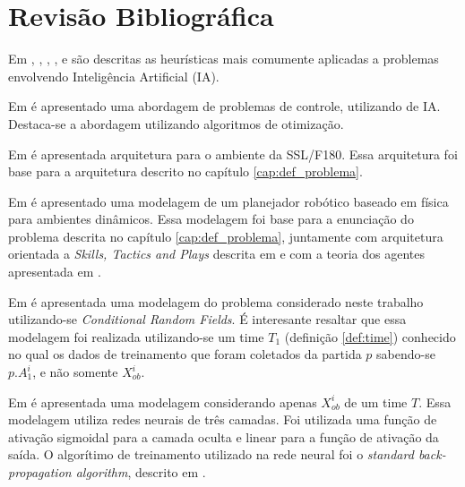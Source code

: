 \chapter{Revisão Bibliográfica}\label{cap:rev_bibliografica}


Em \cite{russellnorvig}, \cite{haykin2001redes}, \cite{kosko1997fuzzy}, \cite{passos2005datamining},
\cite{doringo2004ant} e \cite{bertsimas1993simulated} são descritas as heurísticas
mais comumente aplicadas a problemas envolvendo Inteligência Artificial (IA).

Em \cite{yoneyama2004ia} é apresentado uma abordagem de problemas de controle, utilizando de IA. Destaca-se
a abordagem utilizando algoritmos de otimização.

Em \cite{felixnavarro} é apresentada arquitetura para o ambiente da SSL/F180. Essa arquitetura foi base
para a arquitetura descrito no capítulo \ref{cap:def_problema}.

Em \cite{zickler} é apresentado uma modelagem de um planejador robótico baseado em física para ambientes dinâmicos. 
Essa modelagem foi base para a enunciação do problema descrita no capítulo \ref{cap:def_problema}, juntamente com 
arquitetura orientada a \textit{Skills, Tactics and Plays} descrita em \cite{bowling2003plays} e com a teoria dos 
agentes apresentada em \cite{russellnorvig}.

Em \cite{vail2008crf} é apresentada uma modelagem do problema considerado neste trabalho
utilizando-se \textit{Conditional Random Fields}. É interesante resaltar que essa modelagem
foi realizada utilizando-se um time $T_1$ (definição \ref{def:time}) conhecido no qual os dados
de treinamento que foram coletados da partida $p$ sabendo-se $p.A_1^{i}$, e não somente $X_{ob}^{i}$.

Em \cite{sheng2005motionprediction} é apresentada uma modelagem considerando apenas $X_{ob}^{i}$
de um time $T$. Essa modelagem utiliza redes neurais de três camadas. Foi utilizada
uma função de ativação sigmoidal para a camada oculta e linear para a função de 
ativação da saída. O algorítimo de treinamento utilizado na rede neural foi o \textit{standard back-propagation
algorithm}, descrito em \cite{haykin2001redes}.
